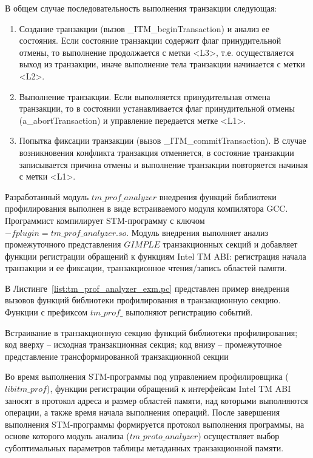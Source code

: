 В общем случае последовательность выполнения транзакции следующая:
\begin{enumerate}
\item Создание транзакции (вызов \_ITM\_beginTransaction) и анализ ее состояния. Если состояние транзакции содержит флаг принудительной отмены, то выполнение продолжается с метки <L3>, т.е. осуществляется выход из транзакции, иначе выполнение тела транзакции начинается с метки <L2>.
\item  Выполнение транзакции. Если выполняется принудительная отмена транзакции, то в состоянии устанавливается флаг принудительной отмены (a\_abortTransaction) и управление передается метке <L1>.
\item Попытка фиксации транзакции (вызов \_ITM\_commitTransaction). В случае возникновения конфликта транзакция отменяется, в состояние транзакции записывается причина отмены и выполнение транзакции повторяется начиная с метки <L1>.
\end{enumerate}

Разработанный модуль $tm\_prof\_analyzer$ внедрения функций библиотеки профилирования выполнен в виде встраиваемого модуля компилятора GCC. Программист компилирует STM-программу с ключом $-fplugin=tm\_prof\_analyzer.so$. Модуль внедрения выполняет анализ промежуточного представления $GIMPLE$ транзакционных секций и добавляет функции регистрации обращений к функциям Intel TM ABI: регистрация начала транзакции и ее фиксации, транзакционное чтения/запись областей памяти.

В Листинге~\ref{list:tm_prof_analyzer_exm.pc} представлен пример внедрения вызовов функций библиотеки профилирования в транзакционную секцию. Функции с префиксом $tm\_prof\_$ выполняют регистрацию событий.

\begin{ListingEnv}[!h]


\caption{Встраивание в транзакционную секцию функций библиотеки профилирования; код вверху -- исходная транзакционная секция; код внизу -- промежуточное представление трансформированной транзакционной секции}
\label{list:tm_prof_analyzer_exm.pc}
\end{ListingEnv}

Во время выполнения STM-программы под управлением профилировщика ($libitm\_prof$), функции регистрации обращений к интерфейсам Intel TM ABI заносят в протокол адреса и размер областей памяти, над которыми выполняются операции, а также время начала выполнения операций. После завершения выполнения STM-программы формируется протокол выполнения программы, на основе которого модуль анализа ($tm\_proto\_analyzer$) осуществляет выбор субоптимальных параметров таблицы метаданных транзакционной памяти.

